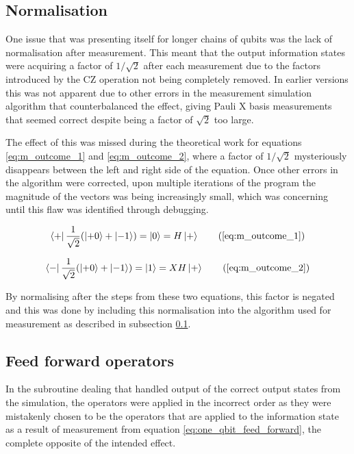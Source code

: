 
\subsection{Normalisation}
\label{subsec:normal}
One issue that was presenting itself for longer chains of qubits was the lack of normalisation after measurement. This meant that the output information states were acquiring a factor of $1 / \sqrt{2}$ after each measurement due to the factors introduced by the CZ operation not being completely removed. In earlier versions this was not apparent due to other errors in the measurement simulation algorithm that counterbalanced the effect, giving Pauli X basis measurements that seemed correct despite being a factor of $\sqrt{2}$ too large. 

The effect of this was missed during the theoretical work for equations \ref{eq:m_outcome_1} and \ref{eq:m_outcome_2}, where a factor of $1 / \sqrt{2}$ mysteriously disappears between the left and right side of the equation. Once other errors in the algorithm were corrected, upon multiple iterations of the program the magnitude of the vectors was being increasingly small, which was concerning until this flaw was identified through debugging.  

\begin{equation}
\bra{+} \frac{1}{\sqrt{2}} (\ket{+ 0} + \ket{- 1}) = \ket{0} = H \ket{+}
\tag{\ref{eq:m_outcome_1}}
\end{equation}

\begin{equation}
\bra{-} \frac{1}{\sqrt{2}} (\ket{+ 0} + \ket{- 1}) = \ket{1} = XH \ket{+}
\tag{\ref{eq:m_outcome_2}}
\end{equation}

By normalising after the steps from these two equations, this factor is negated and this was done by including this normalisation into the algorithm used for measurement as described in subsection \ref{subsec:normal}.


\subsection{Feed forward operators}

In the subroutine dealing that handled output of the correct output states from the simulation, the operators were applied in the incorrect order as they were mistakenly chosen to be the operators that are applied to the information state as a result of measurement from equation \ref{eq:one_qbit_feed_forward}, the complete opposite of the intended effect.

